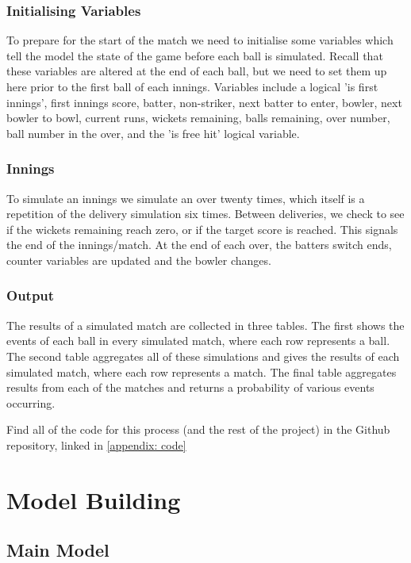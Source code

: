 \subsubsection{Initialising Variables}

To prepare for the start of the match we need to initialise some variables which tell the model the state of the game before each ball is simulated. Recall that these variables are altered at the end of each ball, but we need to set them up here prior to the first ball of each innings. Variables include a logical 'is first innings', first innings score, batter, non-striker, next batter to enter, bowler, next bowler to bowl, current runs, wickets remaining, balls remaining, over number, ball number in the over, and the 'is free hit' logical variable.

\subsubsection{Innings}

To simulate an innings we simulate an over twenty times, which itself is a repetition of the delivery simulation six times. Between deliveries, we check to see if the wickets remaining reach zero, or if the target score is reached. This signals the end of the innings/match. At the end of each over, the batters switch ends, counter variables are updated and the bowler changes.

\subsubsection{Output}

The results of a simulated match are collected in three tables. The first shows the events of each ball in every simulated match, where each row represents a ball. The second table aggregates all of these simulations and gives the results of each simulated match, where each row represents a match. The final table aggregates results from each of the matches and returns a probability of various events occurring.

Find all of the code for this process (and the rest of the project) in the Github repository, linked in \cref{appendix: code}

\section{Model Building}
\label{sec: models}

\subsection{Main Model}

